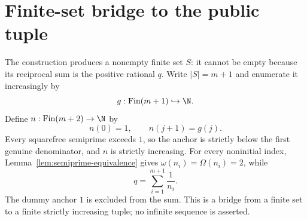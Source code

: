 \section{Finite-set bridge to the public tuple}\label{sec:tuple}

The construction produces a nonempty finite set $S$: it cannot be empty because
its reciprocal sum is the positive rational $q$.  Write $|S|=m+1$ and enumerate
it increasingly by
\[
 g:\operatorname{Fin}(m+1)\hookrightarrow\N.
\]
Define $n:\operatorname{Fin}(m+2)\to\N$ by
\[
 n(0)=1,
 \qquad n(j+1)=g(j).
\]
Every squarefree semiprime exceeds $1$, so the anchor is strictly below the
first genuine denominator, and $n$ is strictly increasing.  For every
noninitial index, Lemma~\ref{lem:semiprime-equivalence} gives
$\omega(n_i)=\Omega(n_i)=2$, while
\[
 q=\sum_{i=1}^{m+1}\frac1{n_i}.
\]
The dummy anchor $1$ is excluded from the sum.  This is a bridge from a finite
set to a finite strictly increasing tuple; no infinite sequence is asserted.

